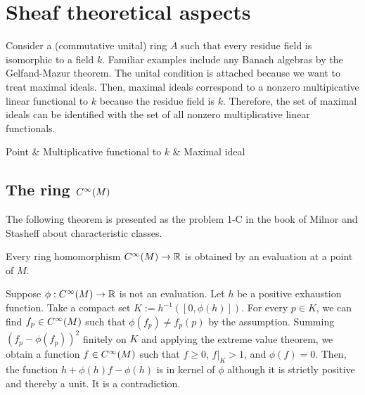 \documentclass{../exp}
\begin{document}
\section{Sheaf theoretical aspects}
Consider a (commutative unital) ring $A$ such that every residue field is isomorphic to a field $k$.
Familiar examples include any Banach algebras by the Gelfand-Mazur theorem.
The unital condition is attached because we want to treat maximal ideals.
Then, maximal ideals correspond to a nonzero multipicative linear functional to $k$ because the residue field is $k$.
Therefore, the set of maximal ideals can be identified with the set of all nonzero multiplicative linear functionals.


\begin{rd}
Point  & Multiplicative functional to $k$  & Maximal ideal 
\end{rd}

\subsection{The ring $C^\infty(M)$}
The following theorem is presented as the problem 1-C in the book of Milnor and Stasheff about characteristic classes.
\begin{thm}
Every ring homomorphism $C^\oo(M)\to\R$ is obtained by an evaluation at a point of $M$.
\end{thm}
\begin{pf}
Suppose $\phi:C^\oo(M)\to\R$ is not an evaluation.
Let $h$ be a positive exhaustion function.
Take a compact set $K:=h^{-1}([0,\phi(h)])$.
For every $p\in K$, we can find $f_p\in C^\infty(M)$ such that $\phi(f_p)\ne f_p(p)$ by the assumption.
Summing $(f_p-\phi(f_p))^2$ finitely on $K$ and applying the extreme value theorem, we obtain a function $f\in C^\infty(M)$ such that $f\ge0$, $f|_K>1$, and $\phi(f)=0$.
Then, the function $h+\phi(h)f-\phi(h)$ is in kernel of $\phi$ although it is strictly positive and thereby a unit.
It is a contradiction.
\end{pf}
\end{document}
